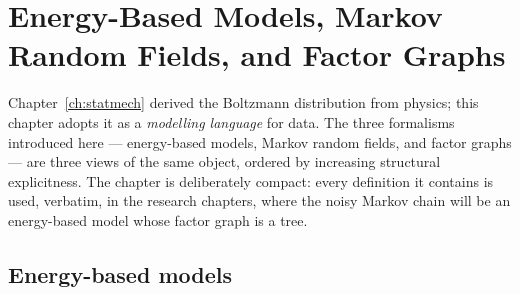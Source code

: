 \chapter{Energy-Based Models, Markov Random Fields, and Factor Graphs}
\label{ch:ebm}

Chapter~\ref{ch:statmech} derived the Boltzmann distribution from physics;
this chapter adopts it as a \emph{modelling language} for data. The three
formalisms introduced here --- energy-based models, Markov random fields,
and factor graphs --- are three views of the same object, ordered by
increasing structural explicitness. The chapter is deliberately compact:
every definition it contains is used, verbatim, in the research chapters,
where the noisy Markov chain will be an energy-based model whose factor
graph is a tree.

\section{Energy-based models}\label{sec:ebm-def}

